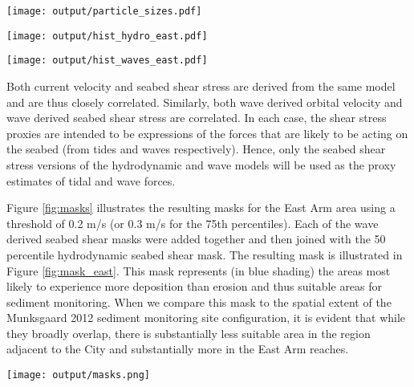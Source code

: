 \documentclass[a4paper]{article}
\let\origfigure=\figure
\let\endorigfigure=\endfigure
\renewenvironment{figure}[1][]{%
   \origfigure[H]
}{%
   \endorigfigure
}
\begin{document}
\begin{figure}
\centering\scriptsize\scriptsize
\texttt{[image: output/particle\_sizes.pdf]}
\caption{The percentage abundance of different sediment grain sizes
observed across the Munksgaard sediment sampling
program.\label{fig:particle_sizes}}
\end{figure}

\begin{figure}
\centering\scriptsize\scriptsize
\texttt{[image: output/hist\_hydro\_east.pdf]}
\caption{Frequency distributions of hydrodynamic products in the East
Arm area.\label{fig:hist_hydro_east}}
\end{figure}

\begin{figure}
\centering\scriptsize\scriptsize
\texttt{[image: output/hist\_waves\_east.pdf]}
\caption{Frequency distributions of wave modelling seabed shear stress
products in the East Arm area.\label{fig:hist_waves_east}}
\end{figure}

Both current velocity and seabed shear stress are derived from the same
model and are thus closely correlated. Similarly, both wave derived
orbital velocity and wave derived seabed shear stress are correlated. In
each case, the shear stress proxies are intended to be expressions of
the forces that are likely to be acting on the seabed (from tides and
waves respectively). Hence, only the seabed shear stress versions of the
hydrodynamic and wave models will be used as the proxy estimates of
tidal and wave forces.

Figure \ref{fig:masks} illustrates the resulting masks for the East Arm
area using a threshold of 0.2 m/s (or 0.3 m/s for the 75th percentiles).
Each of the wave derived seabed shear masks were added together and then
joined with the 50 percentile hydrodynamic seabed shear mask. The
resulting mask is illustrated in Figure \ref{fig:mask_east}. This mask
represents (in blue shading) the areas most likely to experience more
deposition than erosion and thus suitable areas for sediment monitoring.
When we compare this mask to the spatial extent of the Munksgaard 2012
sediment monitoring site configuration, it is evident that while they
broadly overlap, there is substantially less suitable area in the region
adjacent to the City and substantially more in the East Arm reaches.

\begin{figure}
\centering\scriptsize\scriptsize
\texttt{[image: output/masks.png]}
\caption{Individual East Arm masks from various hydrodynamic
(bedShear\_\emph{) and wave (beagle\_}) models categorised using a
threshold values of 0.2 for all other than the 75th percentile products
with use a threshold of 0.3 m/s. The blue areas indicate areas of
predicted relatively low erosion and transport potential and thus good
candidate areas for sample site allocation. The black dots illustrate
the position of Munksgaard 2012 sediment sampling
sites.\label{fig:masks}}
\end{figure}
\end{document}
